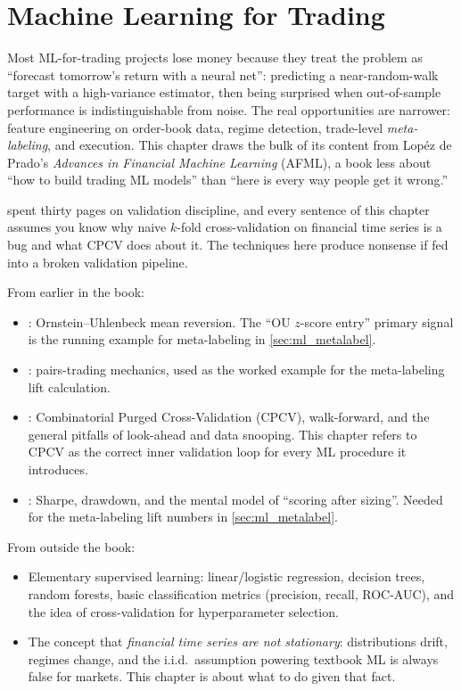 \chapter{Machine Learning for Trading}
\label{ch:ml_trading}

Most ML-for-trading projects lose money because they treat the
problem as ``forecast tomorrow's return with a neural net'':
predicting a near-random-walk target with a high-variance estimator,
then being surprised when out-of-sample performance is indistinguishable
from noise. The real opportunities are narrower: feature engineering on
order-book data, regime detection, trade-level \emph{meta-labeling}, and
execution. This chapter draws the bulk of its content from Lop\'ez de
Prado's \textit{Advances in Financial Machine Learning} (AFML), a book
less about ``how to build trading ML models'' than ``here is every way
people get it wrong.''

 spent thirty pages on validation discipline, and
every sentence of this chapter assumes you know why naive $k$-fold
cross-validation on financial time series is a bug and what CPCV does
about it. The techniques here produce nonsense if fed into a broken
validation pipeline.

\begin{backgroundbox}[Prerequisites]
From earlier in the book:
\begin{itemize}
  \item {}: Ornstein--Uhlenbeck mean
  reversion. The ``OU $z$-score entry'' primary signal is the
  running example for meta-labeling in
  \cref{sec:ml_metalabel}.
  \item {}: pairs-trading mechanics,
  used as the worked example for the meta-labeling lift
  calculation.
  \item {}: Combinatorial Purged
  Cross-Validation (CPCV), walk-forward, and the general
  pitfalls of look-ahead and data snooping. This chapter
  refers to CPCV as the correct inner validation loop for every
  ML procedure it introduces.
  \item {}: Sharpe, drawdown, and the mental
  model of ``scoring after sizing''. Needed for the
  meta-labeling lift numbers in \cref{sec:ml_metalabel}.
\end{itemize}
From outside the book:
\begin{itemize}
  \item Elementary supervised learning: linear/logistic
  regression, decision trees, random forests, basic
  classification metrics (precision, recall, ROC-AUC), and the
  idea of cross-validation for hyperparameter selection.
  \item The concept that \emph{financial time series are not
  stationary}: distributions drift, regimes change, and the
  i.i.d.\ assumption powering textbook ML is always false for
  markets. This chapter is about what to do given that fact.
\end{itemize}
\end{backgroundbox}

